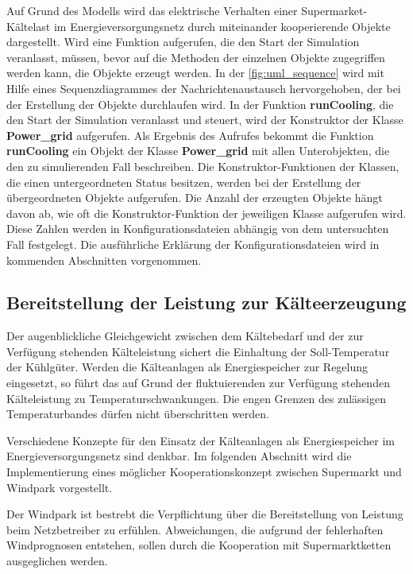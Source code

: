 Auf Grund des Modells wird das elektrische Verhalten einer
Supermarket-K\"altelast im Energieversorgungsnetz durch miteinander
kooperierende Objekte dargestellt. Wird eine Funktion aufgerufen, die den Start
der Simulation veranlasst, m\"ussen, bevor auf die Methoden der einzelnen
Objekte zugegriffen werden kann, die Objekte erzeugt werden. In der
\cref{fig:uml_sequence} wird mit Hilfe eines Sequenzdiagrammes der
Nachrichtenaustausch hervorgehoben, der bei der Erstellung der Objekte
durchlaufen wird. In der Funktion \textbf{runCooling}, die den Start der
Simulation veranlasst und steuert, wird der Konstruktor der Klasse
\textbf{Power\_grid} aufgerufen. Als Ergebnis des Aufrufes bekommt die Funktion
\textbf{runCooling} ein Objekt der Klasse \textbf{Power\_grid} mit allen
Unterobjekten, die den zu simulierenden Fall beschreiben. Die
Konstruktor-Funktionen der Klassen, die einen untergeordneten Status besitzen,
werden bei der Erstellung der \"ubergeordneten Objekte aufgerufen. Die Anzahl
der erzeugten Objekte h\"angt davon ab, wie oft die Konstruktor-Funktion der
jeweiligen Klasse aufgerufen wird. Diese Zahlen werden in Konfigurationsdateien
abh\"angig von dem untersuchten Fall festgelegt. Die ausf\"uhrliche Erkl\"arung
der Konfigurationsdateien wird in kommenden Abschnitten vorgenommen.

\subsection*{Bereitstellung der Leistung zur K\"alteerzeugung}

Der augenblickliche Gleichgewicht zwischen dem K\"altebedarf und der zur
Verf\"ugung stehenden K\"alteleistung sichert die Einhaltung der Soll-Temperatur
der K\"uhlg\"uter. Werden die K\"alteanlagen als Energiespeicher zur Regelung
eingesetzt, so f\"uhrt das auf Grund der fluktuierenden zur Verf\"ugung
stehenden K\"alteleistung zu Temperaturschwankungen. Die engen Grenzen des
zul\"assigen Temperaturbandes d\"urfen nicht \"uberschritten werden.

Verschiedene Konzepte f\"ur den Einsatz der K\"alteanlagen als Energiespeicher
im Energieversorgungsnetz sind denkbar. Im folgenden Abschnitt wird die
Implementierung eines m\"oglicher Kooperationskonzept zwischen Supermarkt und
Windpark vorgestellt.

Der Windpark ist bestrebt die Verpflichtung \"uber die Bereitstellung von
Leistung beim Netzbetreiber zu erf\"uhlen. Abweichungen, die aufgrund der
fehlerhaften Windprognosen entstehen, sollen durch die Kooperation mit
Supermarktketten ausgeglichen werden.

